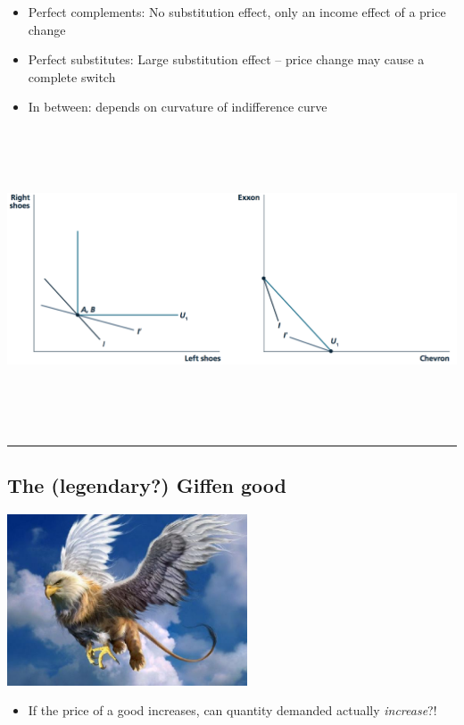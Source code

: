 \documentclass[]{article}
\providecommand{\tightlist}{%
  \setlength{\itemsep}{0pt}\setlength{\parskip}{0pt}}
\begin{document}
\begin{itemize}
\item
  Perfect complements: No substitution effect, only an income effect of
  a price change
\item
  Perfect substitutes: Large substitution effect -- price change may
  cause a complete switch
\item
  In between: depends on curvature of indifference curve
\end{itemize}

\includegraphics[height=3.5in]{picsfigs/substfxperfect_trim.png}

\begin{center}\rule{0.5\linewidth}{\linethickness}\end{center}

\hypertarget{the-legendary-giffen-good}{%
\subsection{The (legendary?) Giffen
good}\label{the-legendary-giffen-good}}

\includegraphics[height=2in]{picsfigs/griffin.jpg}

\begin{itemize}
\tightlist
\item
  If the price of a good increases, can quantity demanded actually
  \emph{increase}?!
\end{itemize}
\end{document}
